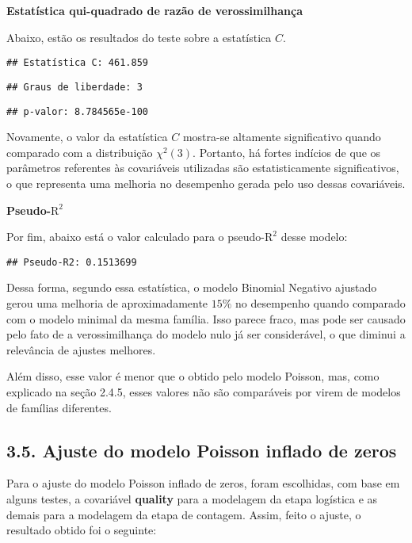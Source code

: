 \documentclass[
]{article}
\begin{document}
\textbf{Estatística qui-quadrado de razão de verossimilhança}

Abaixo, estão os resultados do teste sobre a estatística \(C\).

\begin{verbatim}
## Estatística C: 461.859
\end{verbatim}

\begin{verbatim}
## Graus de liberdade: 3
\end{verbatim}

\begin{verbatim}
## p-valor: 8.784565e-100
\end{verbatim}

Novamente, o valor da estatística \(C\) mostra-se altamente
significativo quando comparado com a distribuição \(\chi^2(3)\).
Portanto, há fortes indícios de que os parâmetros referentes às
covariáveis utilizadas são estatisticamente significativos, o que
representa uma melhoria no desempenho gerada pelo uso dessas
covariáveis.

\textbf{Pseudo-\(\text{R}^2\)}

Por fim, abaixo está o valor calculado para o pseudo-\(\text{R}^2\)
desse modelo:

\begin{verbatim}
## Pseudo-R2: 0.1513699
\end{verbatim}

Dessa forma, segundo essa estatística, o modelo Binomial Negativo
ajustado gerou uma melhoria de aproximadamente \(15\%\) no desempenho
quando comparado com o modelo minimal da mesma família. Isso parece
fraco, mas pode ser causado pelo fato de a verossimilhança do modelo
nulo já ser considerável, o que diminui a relevância de ajustes
melhores.

Além disso, esse valor é menor que o obtido pelo modelo Poisson, mas,
como explicado na seção 2.4.5, esses valores não são comparáveis por
virem de modelos de famílias diferentes.

\subsection{3.5. Ajuste do modelo Poisson inflado de
zeros}\label{ajuste-do-modelo-poisson-inflado-de-zeros}

Para o ajuste do modelo Poisson inflado de zeros, foram escolhidas, com
base em alguns testes, a covariável \textbf{quality} para a modelagem da
etapa logística e as demais para a modelagem da etapa de contagem.
Assim, feito o ajuste, o resultado obtido foi o seguinte:
\end{document}
